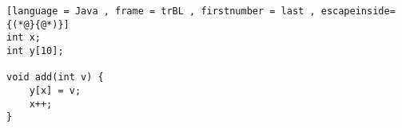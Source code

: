 \begin{lstlisting}[language = Java , frame = trBL , firstnumber = last , escapeinside={(*@}{@*)}]
int x;
int y[10];

void add(int v) {
    y[x] = v;
    x++;
}
\end{lstlisting}
